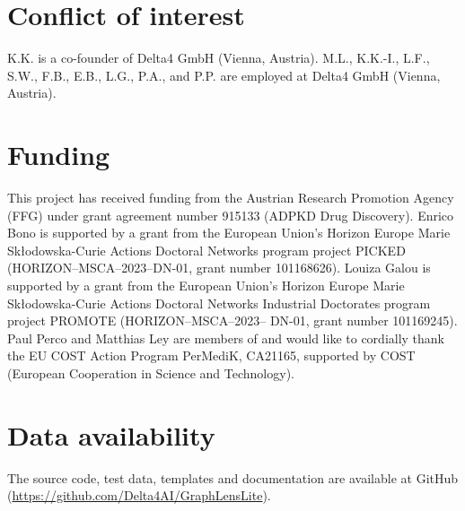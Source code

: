 \section*{Conflict of interest}
K.K. is a co-founder of Delta4 GmbH (Vienna, Austria). M.L., K.K.-I., L.F., S.W., F.B., E.B., L.G., P.A., and P.P. are employed at Delta4 GmbH (Vienna, Austria).

\section*{Funding}
This project has received funding from the Austrian Research Promotion Agency (FFG) under grant agreement number 915133 (ADPKD Drug Discovery). Enrico Bono is supported by a grant from the European Union's Horizon Europe Marie Skłodowska-Curie Actions Doctoral Networks program project PICKED (HORIZON–\allowbreak{}MSCA–\allowbreak{}2023–\allowbreak{}DN-01, grant number 101168626). Louiza Galou is supported by a grant from the European Union's Horizon Europe Marie Skłodowska-Curie Actions Doctoral Networks Industrial Doctorates program project PROMOTE (HORIZON–MSCA–2023– DN-01, grant number 101169245). Paul Perco and Matthias Ley are members of and would like to cordially thank the EU COST Action Program PerMediK, CA21165, supported by COST (European Cooperation in Science and Technology).

\section*{Data availability}
The source code, test data, templates and documentation are available at GitHub (\url{https://github.com/Delta4AI/GraphLensLite}).


